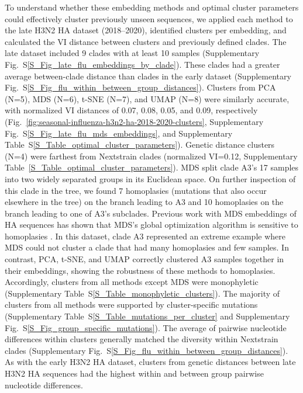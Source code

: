 \documentclass[webpdf,contemporary,large,single]{oup-authoring-template}%
\theoremstyle{thmstyleone}%
\theoremstyle{thmstyletwo}%
\theoremstyle{thmstylethree}%
\begin{document}
To understand whether these embedding methods and optimal cluster parameters could effectively cluster previously unseen sequences, we applied each method to the late H3N2 HA dataset (2018--2020), identified clusters per embedding, and calculated the VI distance between clusters and previously defined clades.
The late dataset included 9 clades with at least 10 samples (Supplementary Fig.~S\ref{S_Fig_late_flu_embeddings_by_clade}).
These clades had a greater average between-clade distance than clades in the early dataset (Supplementary Fig.~S\ref{S_Fig_flu_within_between_group_distances}).
Clusters from PCA (N=5), MDS (N=6), t-SNE (N=7), and UMAP (N=8) were similarly accurate, with normalized VI distances of 0.07, 0.08, 0.05, and 0.09, respectively (Fig.~\ref{fig:seasonal-influenza-h3n2-ha-2018-2020-clusters}, Supplementary Fig.~S\ref{S_Fig_late_flu_mds_embeddings}, and Supplementary Table~S\ref{S_Table_optimal_cluster_parameters}).
Genetic distance clusters (N=4) were farthest from Nextstrain clades (normalized VI=0.12, Supplementary Table~\ref{S_Table_optimal_cluster_parameters}).
MDS split clade A3's 17 samples into two widely separated groups in its Euclidean space.
On further inspection of this clade in the tree, we found 7 homoplasies (mutations that also occur elsewhere in the tree) on the branch leading to A3 and 10 homoplasies on the branch leading to one of A3's subclades.
Previous work with MDS embeddings of HA sequences has shown that MDS's global optimization algorithm is sensitive to homoplasies \citep{Ito2011}.
In this dataset, clade A3 represented an extreme example where MDS could not cluster a clade that had many homoplasies and few samples.
In contrast, PCA, t-SNE, and UMAP correctly clustered A3 samples together in their embeddings, showing the robustness of these methods to homoplasies.
Accordingly, clusters from all methods except MDS were monophyletic (Supplementary Table~S\ref{S_Table_monophyletic_clusters}).
The majority of clusters from all methods were supported by cluster-specific mutations (Supplementary Table~S\ref{S_Table_mutations_per_cluster} and Supplementary Fig.~S\ref{S_Fig_group_specific_mutations}).
The average of pairwise nucleotide differences within clusters generally matched the diversity within Nextstrain clades (Supplementary Fig.~S\ref{S_Fig_flu_within_between_group_distances}).
As with the early H3N2 HA dataset, clusters from genetic distances between late H3N2 HA sequences had the highest within and between group pairwise nucleotide differences.
\end{document}
